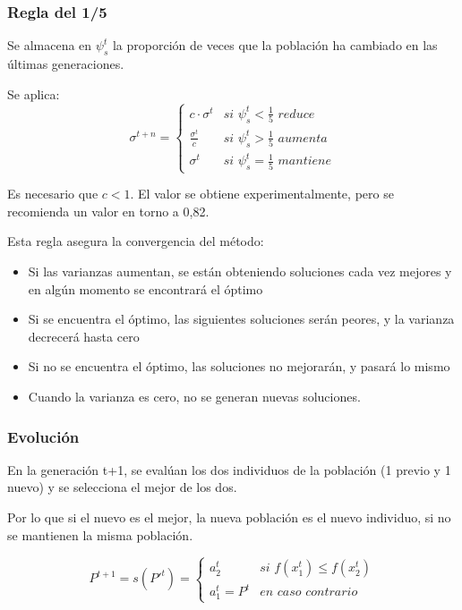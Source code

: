 \documentclass[12pt, twoside, openright]{report} %
\begin{document}
\subsubsection{Regla del 1/5}
Se almacena en $\psi^t_s$ la proporción de veces que la población ha cambiado en las últimas generaciones.

Se aplica:
$$\sigma^{t+n} = \begin{cases} 
	c \cdot \sigma^t & \textit{si }\psi^t_s < \frac{1}{5} \textit{ reduce}\\
	\frac{\sigma^t}{c} & \textit{si }\psi^t_s > \frac{1}{5} \textit{ aumenta}\\
	\sigma^t & \textit{si }\psi^t_s = \frac{1}{5}  \textit{ mantiene}
 \end{cases}$$

Es necesario que $c<1$. El valor se obtiene experimentalmente, pero se recomienda un valor en torno a 0,82.

Esta regla asegura la convergencia del método:
\begin{itemize}
	\item Si las varianzas aumentan, se están obteniendo soluciones cada vez mejores y en algún momento se encontrará el óptimo 
	\item Si se encuentra el óptimo, las siguientes soluciones serán peores, y la varianza decrecerá hasta cero 
	\item Si no se encuentra el óptimo, las soluciones no mejorarán, y pasará lo mismo 
	\item Cuando la varianza es cero, no se generan nuevas soluciones.
\end{itemize}

\subsubsection{Evolución}
En la generación t+1, se evalúan los dos individuos de la población (1 previo y 1 nuevo) y se selecciona el mejor de los dos.

Por lo que si el nuevo es el mejor, la nueva población es el nuevo individuo, si no se mantienen la misma población.

$$P^{t+1}=s(P'^t)= \begin{cases} 
	a^t_2 & \textit{si } f(x^t_1)\leq f(x^t_2)\\
	a^t_1 = P^t & \textit{en caso contrario}
 \end{cases}$$
\end{document}
